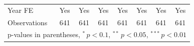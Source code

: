 \begin{table}[htbp]
\begin{tabular*}{\hsize}{@{\hskip\tabcolsep\extracolsep\fill}l*{7}{c}}
\midrule
\addlinespace Year FE&         Yes         &         Yes         &         Yes         &         Yes         &         Yes         &         Yes         &         Yes         \\
\addlinespace \midrule \addlinespace Observations&         641         &         641         &         641         &         641         &         641         &         641         &         641         \\
\bottomrule
\multicolumn{8}{l}{\footnotesize p-values in parentheses, $^{*}\, p<0.1$, $^{**}\, p<0.05$, $^{***}\, p<0.01$}\\
\end{tabular*}
\end{table}
